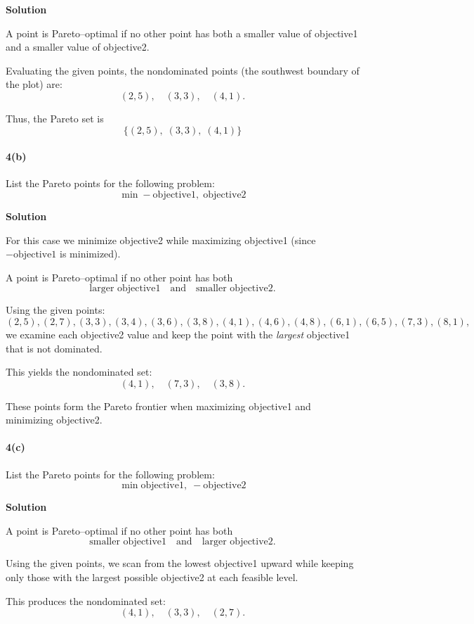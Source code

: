 \documentclass[11pt]{article}
\begin{document}
	\noindent\textbf{Solution}
	
	A point is Pareto--optimal if no other point has both a smaller value of objective1
	and a smaller value of objective2.
	
	Evaluating the given points, the nondominated points (the southwest boundary of the plot) are:
	\[
	(2,5),\quad (3,3),\quad (4,1).
	\]
	
	Thus, the Pareto set is
	\[
	\{(2,5),\; (3,3),\; (4,1)\}
	\]
	
	\paragraph{4(b)} List the Pareto points for the following problem:
	\[
	\min-\text{objective1},\; \text{objective2} \tag{5}
	\]
	
	\noindent\textbf{Solution}
	
	For this case we minimize objective2 while maximizing objective1 (since $-\text{objective1}$ is minimized).
	
	A point is Pareto--optimal if no other point has both
	\[
	\text{larger objective1} \quad \text{and} \quad \text{smaller objective2}.
	\]
	
	Using the given points:
	\[
	(2,5), (2,7), (3,3), (3,4), (3,6), (3,8), (4,1), (4,6), (4,8),
	(6,1), (6,5), (7,3), (8,1),
	\]
	we examine each objective2 value and keep the point with the \emph{largest} objective1 that is not dominated.
	
	This yields the nondominated set:
	\[
	(4,1),\quad (7,3),\quad (3,8).
	\]
	
	These points form the Pareto frontier when maximizing objective1 and minimizing objective2.
	
	\paragraph{4(c)} List the Pareto points for the following problem:
	\[
	\min\text{objective1},\; -\text{objective2} \tag{6}
	\]
	
	\noindent\textbf{Solution}
	
	A point is Pareto--optimal if no other point has both
	\[
	\text{smaller objective1} \quad \text{and} \quad \text{larger objective2}.
	\]
	
	Using the given points, we scan from the lowest objective1 upward while keeping only those
	with the largest possible objective2 at each feasible level.
	
	This produces the nondominated set:
	\[
	(4,1),\quad (3,3),\quad (2,7).
	\]
	
\end{document}
